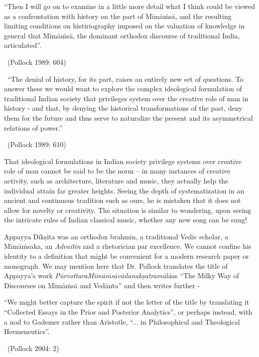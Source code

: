 \begin{myquote}
“Then I will go on to examine in a little more detail what I think could be viewed as a confrontation with history on the part of Mīmāṁsā, and the resulting limiting conditions on histiriography imposed on the valuation of knowledge in general that Mīmāṁsā, the dominant orthodox discourse of traditional India, articulated”. 

~\hfill (Pollock 1989: 604)
\end{myquote}


~\hfill “The denial of history, for its part, raises an entirely new set of questions. To answer these we would want to explore the complex ideological formulation of traditional Indian society that privileges system over the creative role of man in history - and that, by denying the historical transformations of the past, deny them for the future and thus serve to naturalize the present and its asymmetrical relations of power.” 

~\hfill (Pollock 1989: 610)

That ideological formulations in Indian society privilege systems over creative role of man cannot be said to be the norm – in many instances of creative activity, such as architecture, literature and music, they actually help the individual attain far greater heights. Seeing the depth of systematization in an ancient and continuous tradition such as ours, he is mistaken that it does not allow for novelty or creativity. The situation is similar to wondering, upon seeing the intricate rules of Indian classical music, whether any new song can be sung! 

Appayya Dīkṣita was an orthodox brahmin, a traditional Vedic scholar, a Mīmāṁsaka, an \textit{Advaitin} and a rhetorician par excellence. We cannot confine his identity to a definition that might be convenient for a modern research paper or monograph. We may mention here that Dr. Pollock translates the title of Appayya’s work \textit{PūrvottaraMīmāṁsāvādanakṣatramālā}as “The Milky Way of Discourses on Mīmāṁsā and Vedānta” and then writes further -

\begin{myquote}
“We might better capture the spirit if not the letter of the title by translating it “Collected Essays in the Prior and Posterior Analytics”, or perhaps instead, with a nod to Gademer rather than Aristotle, “... in Philosophical and Theological Hermeneutics”. 

~\hfill (Pollock 2004: 2)
\end{myquote}

